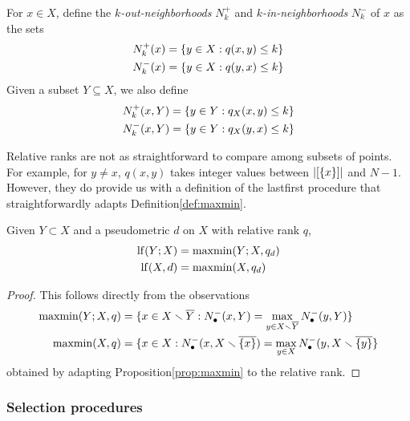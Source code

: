\documentclass{article}
\begin{document}
\begin{definition}
    For $x \in X$, define the \emph{$k$-out-neighborhoods} $N^+_k$ and \emph{$k$-in-neighborhoods} $N^-_k$ of $x$ as the sets
    \begin{align*}
        & N^+_k(x)=\{y\in X : q(x,y)\leq k\} \\
        & N^-_k(x)=\{y\in X : q(y,x)\leq k\}
    \end{align*}
    Given a subset $Y \subseteq X$, we also define
    \begin{align*}
        & N^+_k(x,Y)=\{y\in Y : q_X(x,y)\leq k\} \\
        & N^-_k(x,Y)=\{y\in Y : q_X(y,x)\leq k\}
    \end{align*}
\end{definition}

Relative ranks are not as straightforward to compare among subsets of
points. For example, for \(y\neq x\), \(q(x,y)\) takes integer values
between \(\lvert [\{x\}]\rvert\) and \(N-1\). However, they do provide us
with a definition of the lastfirst procedure that straightforwardly
adapts Definition\nbs\ref{def:maxmin}.

\begin{corollary}
    Given $Y\subset X$ and a pseudometric $d$ on $X$ with relative rank $q$,
    \begin{align*}
        \operatorname{lf}(Y;X) &= \operatorname{maxmin}(Y;X,q_d) \\
        \operatorname{lf}(X,d) &= \operatorname{maxmin}(X,q_d)
    \end{align*}
\end{corollary}

\begin{proof}
This follows directly from the observations
\begin{align*}
    \operatorname{maxmin}(Y;X,q) &= \{x\in X\smallsetminus \overline{Y} : N_\bullet^-(x,Y) = \max_{y\in X\smallsetminus \overline{Y}}{N_\bullet^-(y,Y)}\} \\
    \operatorname{maxmin}(X,q) &= \{x\in X : N_\bullet^-(x,X \smallsetminus \overline{\{x\}}) = \max_{y\in X}{N_\bullet^-(y,X \smallsetminus \overline{\{y\}}}\}
\end{align*}
obtained by adapting Proposition\nbs\ref{prop:maxmin} to the relative rank.
\end{proof}

\hypertarget{selection-procedures}{%
\subsubsection{Selection procedures}\label{selection-procedures}}
\end{document}
